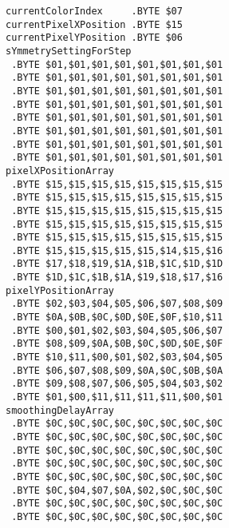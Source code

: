 \begin{minipage}[b]{0.33\linewidth}
\begin{lrbox}{\mybox}
\begin{lstlisting}[basicstyle=\ttfamily\tiny]
currentColorIndex     .BYTE $07
currentPixelXPosition .BYTE $15
currentPixelYPosition .BYTE $06
sYmmetrySettingForStep
 .BYTE $01,$01,$01,$01,$01,$01,$01,$01
 .BYTE $01,$01,$01,$01,$01,$01,$01,$01
 .BYTE $01,$01,$01,$01,$01,$01,$01,$01
 .BYTE $01,$01,$01,$01,$01,$01,$01,$01
 .BYTE $01,$01,$01,$01,$01,$01,$01,$01
 .BYTE $01,$01,$01,$01,$01,$01,$01,$01
 .BYTE $01,$01,$01,$01,$01,$01,$01,$01
 .BYTE $01,$01,$01,$01,$01,$01,$01,$01
pixelXPositionArray   
 .BYTE $15,$15,$15,$15,$15,$15,$15,$15
 .BYTE $15,$15,$15,$15,$15,$15,$15,$15
 .BYTE $15,$15,$15,$15,$15,$15,$15,$15
 .BYTE $15,$15,$15,$15,$15,$15,$15,$15
 .BYTE $15,$15,$15,$15,$15,$15,$15,$15
 .BYTE $15,$15,$15,$15,$15,$14,$15,$16
 .BYTE $17,$18,$19,$1A,$1B,$1C,$1D,$1D
 .BYTE $1D,$1C,$1B,$1A,$19,$18,$17,$16
pixelYPositionArray   
 .BYTE $02,$03,$04,$05,$06,$07,$08,$09
 .BYTE $0A,$0B,$0C,$0D,$0E,$0F,$10,$11
 .BYTE $00,$01,$02,$03,$04,$05,$06,$07
 .BYTE $08,$09,$0A,$0B,$0C,$0D,$0E,$0F
 .BYTE $10,$11,$00,$01,$02,$03,$04,$05
 .BYTE $06,$07,$08,$09,$0A,$0C,$0B,$0A
 .BYTE $09,$08,$07,$06,$05,$04,$03,$02
 .BYTE $01,$00,$11,$11,$11,$11,$00,$01
smoothingDelayArray   
 .BYTE $0C,$0C,$0C,$0C,$0C,$0C,$0C,$0C
 .BYTE $0C,$0C,$0C,$0C,$0C,$0C,$0C,$0C
 .BYTE $0C,$0C,$0C,$0C,$0C,$0C,$0C,$0C
 .BYTE $0C,$0C,$0C,$0C,$0C,$0C,$0C,$0C
 .BYTE $0C,$0C,$0C,$0C,$0C,$0C,$0C,$0C
 .BYTE $0C,$04,$07,$0A,$02,$0C,$0C,$0C
 .BYTE $0C,$0C,$0C,$0C,$0C,$0C,$0C,$0C
 .BYTE $0C,$0C,$0C,$0C,$0C,$0C,$0C,$0C
\end{lstlisting}
\end{lrbox}%
\scalebox{0.7}{\usebox{\mybox}}
\end{minipage}
\hspace{-0.8cm}
